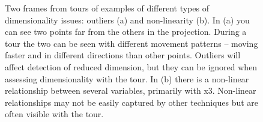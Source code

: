 \documentclass[
  letterpaper,
]{krantz}
\begin{document}
\begin{figure}

\begin{minipage}{0.50\linewidth}



\end{minipage}%
%
\begin{minipage}{0.50\linewidth}



\end{minipage}%

\caption{\label{fig-outlier-nonlin-pdf}Two frames from tours of examples
of different types of dimensionality issues: outliers (a) and
non-linearity (b). In (a) you can see two points far from the others in
the projection. During a tour the two can be seen with different
movement patterns -- moving faster and in different directions than
other points. Outliers will affect detection of reduced dimension, but
they can be ignored when assessing dimensionality with the tour. In (b)
there is a non-linear relationship between several variables, primarily
with x3. Non-linear relationships may not be easily captured by other
techniques but are often visible with the tour. }

\end{figure}%
\end{document}
